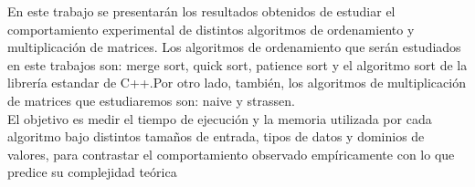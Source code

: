 En este trabajo se presentarán los resultados obtenidos de estudiar el comportamiento experimental de distintos algoritmos de ordenamiento y multiplicación de matrices. Los algoritmos de ordenamiento que serán estudiados en este trabajos son: merge sort, quick sort, patience sort y el algoritmo sort de la librería estandar de C++.Por otro lado, también, los algoritmos de multiplicación de matrices que estudiaremos son: naive y strassen. \\
El objetivo es medir el tiempo de ejecución y la memoria utilizada por cada algoritmo bajo distintos tamaños de entrada, tipos de datos y dominios de valores, para contrastar el comportamiento observado empíricamente con lo que predice su complejidad teórica